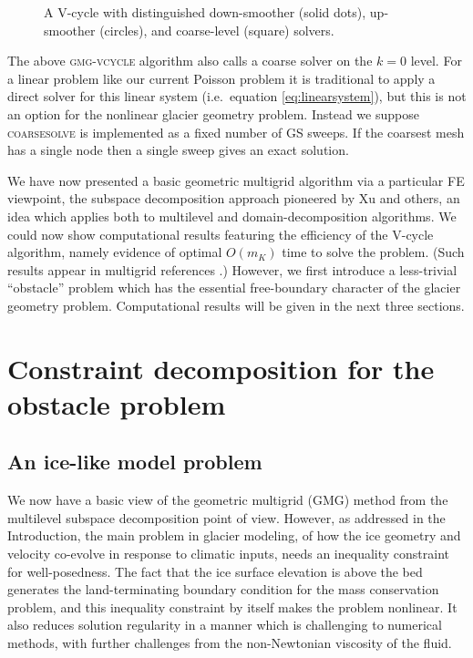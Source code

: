 \documentclass[letterpaper,final,12pt,reqno]{amsart}
\numberwithin{equation}{section}
\numberwithin{figure}{section}
\numberwithin{table}{section}
\begin{document}
\begin{figure}

\caption{A V-cycle with distinguished down-smoother (solid dots), up-smoother (circles), and coarse-level (square) solvers.}
\label{fig:vcycle}
\end{figure}

The above \textsc{gmg-vcycle} algorithm also calls a coarse solver on the $k=0$ level.  For a linear problem like our current Poisson problem it is traditional to apply a direct solver for this linear system (i.e.~equation \eqref{eq:linearsystem}), but this is not an option for the nonlinear glacier geometry problem.  Instead we suppose \textsc{coarsesolve} is implemented as a fixed number of GS sweeps.  If the coarsest mesh has a single node then a single sweep gives an exact solution.

We have now presented a basic geometric multigrid algorithm via a particular FE viewpoint, the subspace decomposition approach pioneered by Xu \cite{Xu1992} and others, an idea which applies both to multilevel and domain-decomposition algorithms.  We could now show computational results featuring the efficiency of the V-cycle algorithm, namely evidence of optimal $O(m_K)$ time to solve the problem.  (Such results appear in multigrid references \cite{Briggsetal2000,Bueler2021,Elmanetal2014,Trottenbergetal2001}.)  However, we first introduce a less-trivial ``obstacle'' problem which has the essential free-boundary character of the glacier geometry problem.  Computational results will be given in the next three sections.


\section{Constraint decomposition for the obstacle problem} \label{sec:obstacle}

\subsection*{An ice-like model problem}  We now have a basic view of the geometric multigrid (GMG) method from the multilevel subspace decomposition point of view.  However, as addressed in the Introduction, the main problem in glacier modeling, of how the ice geometry and velocity co-evolve in response to climatic inputs, needs an inequality constraint for well-posedness.  The fact that the ice surface elevation is above the bed generates the land-terminating boundary condition for the mass conservation problem, and this inequality constraint by itself makes the problem nonlinear.  It also reduces solution regularity in a manner which is challenging to numerical methods, with further challenges from the non-Newtonian viscosity of the fluid.
\end{document}
